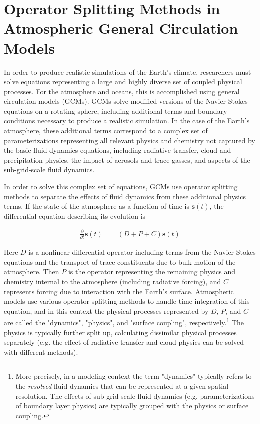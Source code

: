 \documentclass [11pt, proquest] {uwthesis}[2020/02/24]
\begin{document}
\section{Operator Splitting Methods in Atmospheric General Circulation Models} \label{sec:splitting}

In order to produce realistic simulations of the Earth's climate, researchers must solve equations representing a large and highly diverse set of coupled physical processes. For the atmosphere and oceans, this is accomplished using general circulation models (GCMs). GCMs solve modified versions of the Navier-Stokes equations on a rotating sphere, including additional terms and boundary conditions necessary to produce a realistic simulation. In the case of the Earth's atmosphere, these additional terms correspond to a complex set of parameterizations representing all relevant physics and chemistry not captured by the basic fluid dynamics equations, including radiative transfer, cloud and precipitation physics, the impact of aerosols and trace gasses, and aspects of the sub-grid-scale fluid dynamics.

In order to solve this complex set of equations, GCMs use operator splitting methods to separate the effects of fluid dynamics from these additional physics terms. If the state of the atmosphere as a function of time is $\mathbf{s}(t)$, the differential equation describing its evolution is

\begin{align}
    \frac{\partial}{\partial t} \mathbf{s}(t) &= (D + P + C) \mathbf{s}(t)
\end{align}

Here $D$ is a nonlinear differential operator including terms from the Navier-Stokes equations and the transport of trace constituents due to bulk motion of the atmosphere. Then $P$ is the operator representing the remaining physics and chemistry internal to the atmosphere (including radiative forcing), and $C$ represents forcing due to interaction with the Earth's surface. Atmospheric models use various operator splitting methods to handle time integration of this equation, and in this context the physical processes represented by $D$, $P$, and $C$ are called the "dynamics", "physics", and "surface coupling", respectively.\footnote{More precisely, in a modeling context the term "dynamics" typically refers to the \emph{resolved} fluid dynamics that can be represented at a given spatial resolution. The effects of sub-grid-scale fluid dynamics (e.g. parameterizations of boundary layer physics) are typically grouped with the physics or surface coupling.} The physics is typically further split up, calculating dissimilar physical processes separately (e.g. the effect of radiative transfer and cloud physics can be solved with different methods).
\end{document}
